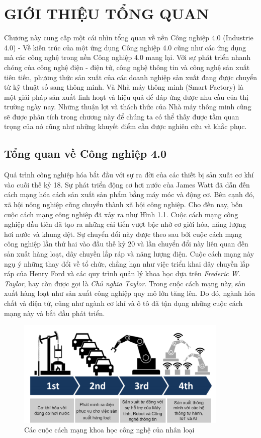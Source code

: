 
\chapter{GIỚI THIỆU TỔNG QUAN}
Chương này cung cấp một cái nhìn tổng quan về nền Công nghiệp 4.0 (Industrie 4.0) - Về kiến trúc của một ứng dụng Công nghiệp 4.0 cũng như các ứng dụng mà các công nghệ trong nền Công nghiệp 4.0 mang lại. Với sự phát triển nhanh chóng của công nghệ điện - điện tử, công nghệ thông tin và công nghệ sản xuất tiên tiến, phương thức sản xuất của các doanh nghiệp sản xuất đang được chuyển từ kỹ thuật số sang thông minh. Và Nhà máy thông minh (Smart Factory) là một giải pháp sản xuất linh hoạt và hiệu quả để đáp ứng được nhu cầu của thị trường ngày nay. Những thuận lợi và thách thức của Nhà máy thông minh cũng sẽ được phân tích trong chương này để chúng ta có thể thấy được tầm quan trọng của nó cũng như những khuyết điểm cần được nghiên cứu và khắc phục.


\section{Tổng quan về Công nghiệp 4.0}

Quá trình công nghiệp hóa bắt đầu với sự ra đời của các thiết bị sản xuất cơ khí vào cuối thế kỷ 18. Sự phát triển động cơ hơi nước của James Watt đã dẫn đến cách mạng hóa cách sản xuất sản phẩm bằng máy móc và động cơ. Bên cạnh đó, xã hội nông nghiệp cũng chuyển thành xã hội công nghiệp. Cho đến nay, bốn cuộc cách mạng công nghiệp đã xảy ra như Hình 1.1. Cuộc cách mạng công nghiệp đầu tiên đã tạo ra những cải tiến vượt bậc nhờ cơ giới hóa, năng lượng hơi nước và khung dệt. Sự chuyển đổi này được theo sau bởi cuộc cách mạng công nghiệp lần thứ hai vào đầu thế kỷ 20 và lần chuyển đổi này liên quan đến sản xuất hàng loạt, dây chuyền lắp ráp và năng lượng điện. Cuộc cách mạng này ngụ ý những thay đổi về tổ chức, chẳng hạn như việc triển khai dây chuyền lắp ráp của Henry Ford và các quy trình quản lý khoa học dựa trên \textit{Frederic W. Taylor}, hay còn được gọi là \textit{Chủ nghĩa Taylor}. Trong cuộc cách mạng này, sản xuất hàng loạt như sản xuất công nghiệp quy mô lớn tăng lên. Do đó, ngành hóa chất và điện tử, cũng như ngành cơ khí và ô tô đã tận dụng những cuộc cách mạng này và bắt đầu phát triển.

\begin{figure}[!h]
    \centering
    \includegraphics[width=0.9\textwidth]{Images/Intro/4.0revolution.jpg}
    \caption{Các cuộc cách mạng khoa học công nghệ của nhân loại}
    \label{fig:comp_mqtt}
\end{figure}

